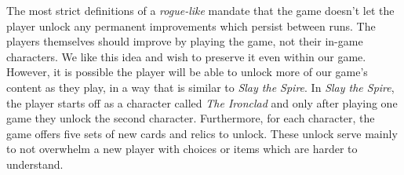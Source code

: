 \begin{notindemo}
    The most strict definitions of a \emph{rogue-like} mandate that the game doesn't let the player unlock any permanent improvements which persist between runs.
    The players themselves should improve by playing the game, not their in-game characters.
    We like this idea and wish to preserve it even within our game.
    However, it is possible the player will be able to unlock more of our game's content as they play, in a way that is similar to \emph{Slay the Spire}.
    In \emph{Slay the Spire}, the player starts off as a character called \emph{The Ironclad} and only after playing one game they unlock the second character.
    Furthermore, for each character, the game offers five sets of new cards and relics to unlock.
    These unlock serve mainly to not overwhelm a new player with choices or items which are harder to understand.

\end{notindemo}